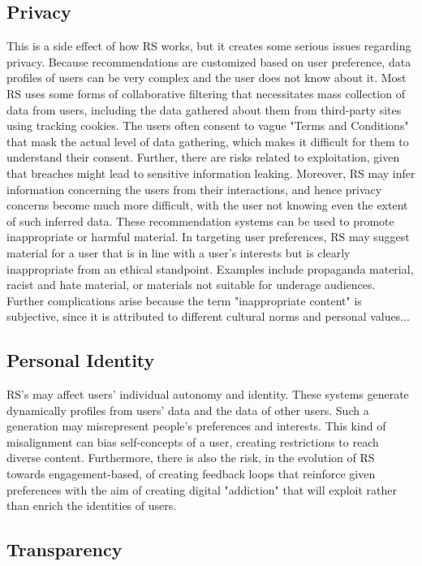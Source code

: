 \documentclass{article}
\begin{document}
\subsection{Privacy}
This is a side effect of how RS works, but it creates some serious issues regarding privacy. Because recommendations are customized based on user preference, data profiles of users can be very complex and the user does not know about it. Most RS uses some forms of collaborative filtering that necessitates mass collection of data from users, including the data gathered about them from third-party sites using tracking cookies. The users often consent to vague "Terms and Conditions" that mask the actual level of data gathering, which makes it difficult for them to understand their consent.\cite{IaAEC_in_RS} Further, there are risks related to exploitation, given that breaches might lead to sensitive information leaking. Moreover, RS may infer information concerning the users from their interactions, and hence privacy concerns become much more difficult, with the user not knowing even the extent of such inferred data.\clearpage
These recommendation systems can be used to promote inappropriate or harmful material. In targeting user preferences, RS may suggest material for a user that is in line with a user's interests but is clearly inappropriate from an ethical standpoint.\cite{FB} Examples include propaganda material, racist and hate material, or materials not suitable for underage audiences. Further complications arise because the term "inappropriate content" is subjective, since it is attributed to different cultural norms and personal values...

\subsection{Personal Identity}
RS's may affect users' individual autonomy and identity. These systems generate dynamically profiles from users' data and the data of other users. Such a generation may misrepresent people's preferences and interests. This kind of misalignment can bias self-concepts of a user, creating restrictions to reach diverse content. Furthermore, there is also the risk, in the evolution of RS towards engagement-based, of creating feedback loops that reinforce given preferences with the aim of creating digital "addiction" that will exploit rather than enrich the identities of users.\cite{FB}
\subsection{Transparency}
\end{document}
